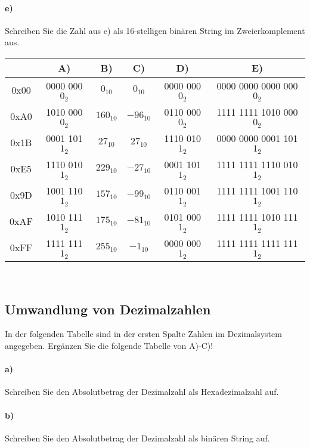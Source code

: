 \documentclass[paper=a4, fontsize=11pt]{scrartcl}
\numberwithin{equation}{section}
\numberwithin{figure}{section}
\numberwithin{table}{section}
\begin{document}
\paragraph{e)}
Schreiben Sie die Zahl aus c) als 16-stelligen binären String im Zweierkomplement aus. \\

\begin{tabular}{|c|c|c|c|c|c|}
\hline
& A) & B) & C) & D) & E) \\
\hline
0x00 & 0000 000$0_{2}$ & $0_{10}$ & $0_{10}$ & 0000 000$0_{2}$ & 0000 0000 0000 000$0_{2}$ \\
\hline
0xA0 & 1010 000$0_{2}$ & $160_{10}$ & $-96_{10}$ & 0110 000$0_{2}$ & 1111 1111 1010 000$0_{2}$ \\
\hline
0x1B & 0001 101$1_{2}$ & $27_{10}$ & $27_{10}$ & 1110 010$1_{2}$ & 0000 0000 0001 101$1_{2}$ \\
\hline
0xE5 & 1110 010$1_{2}$ & $229_{10}$ & $-27_{10}$ & 0001 101$1_{2}$ & 1111 1111 1110 010$1_{2}$ \\
\hline
0x9D & 1001 110$1_{2}$ & $157_{10}$ & $-99_{10}$ & 0110 001$1_{2}$ & 1111 1111 1001 110$1_{2}$ \\
\hline
0xAF & 1010 111$1_{2}$ & $175_{10}$ & $-81_{10}$ & 0101 000$1_{2}$ & 1111 1111 1010 111$1_{2}$ \\
\hline
0xFF & 1111 111$1_{2}$ & $255_{10}$ & $-1_{10}$ & 0000 000$1_{2}$ & 1111 1111 1111 111$1_{2}$ \\
\hline
\end{tabular} \\


\subsection{Umwandlung von Dezimalzahlen}

In der folgenden Tabelle sind in der ersten Spalte Zahlen im Dezimalsystem angegeben. Ergänzen Sie die folgende Tabelle von A)-C)!

\paragraph{a)}
Schreiben Sie den Absolutbetrag der Dezimalzahl als Hexadezimalzahl auf. \\

\paragraph{b)}
Schreiben Sie den Absolutbetrag der Dezimalzahl als binären String auf. \\
\end{document}
